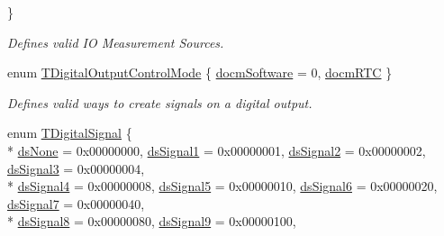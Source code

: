 \begin{DoxyCompactItemize}
 \}
\begin{DoxyCompactList}\small\item\em Defines valid I\+O Measurement Sources. \end{DoxyCompactList}\item 
enum \hyperlink{group___device_specific_interface_ga8f01f0c294f3f5476c9b9ffcec55a80b}{T\+Digital\+Output\+Control\+Mode} \{ \hyperlink{group___device_specific_interface_gga8f01f0c294f3f5476c9b9ffcec55a80bad6f74b62d8b4c41f1f25f61efa9d6aa6}{docm\+Software} = 0, 
\hyperlink{group___device_specific_interface_gga8f01f0c294f3f5476c9b9ffcec55a80baf77a5876e0696ba056ae358071a21f32}{docm\+R\+T\+C}
 \}
\begin{DoxyCompactList}\small\item\em Defines valid ways to create signals on a digital output. \end{DoxyCompactList}\item 
enum \hyperlink{group___device_specific_interface_ga29840a466892bced617a5f3a6edb5218}{T\+Digital\+Signal} \{ \\*
\hyperlink{group___device_specific_interface_gga29840a466892bced617a5f3a6edb5218a8638257c7c390c00230b6476cb9e1190}{ds\+None} = 0x00000000, 
\hyperlink{group___device_specific_interface_gga29840a466892bced617a5f3a6edb5218a7a0ab121051662930349f134122b2ff6}{ds\+Signal1} = 0x00000001, 
\hyperlink{group___device_specific_interface_gga29840a466892bced617a5f3a6edb5218aced89a35ee2a0cd3bab2c02cf30069f2}{ds\+Signal2} = 0x00000002, 
\hyperlink{group___device_specific_interface_gga29840a466892bced617a5f3a6edb5218ad9438b1702244af545d4f4364421e861}{ds\+Signal3} = 0x00000004, 
\\*
\hyperlink{group___device_specific_interface_gga29840a466892bced617a5f3a6edb5218a1c0db2967e13f97aa04135ae6818baf4}{ds\+Signal4} = 0x00000008, 
\hyperlink{group___device_specific_interface_gga29840a466892bced617a5f3a6edb5218a27cba26a8085ebce36b583ebdc54264e}{ds\+Signal5} = 0x00000010, 
\hyperlink{group___device_specific_interface_gga29840a466892bced617a5f3a6edb5218a25e8866304dea9e105766ae4ace7c896}{ds\+Signal6} = 0x00000020, 
\hyperlink{group___device_specific_interface_gga29840a466892bced617a5f3a6edb5218aabf506a0859a94cb16168a12305f1ff1}{ds\+Signal7} = 0x00000040, 
\\*
\hyperlink{group___device_specific_interface_gga29840a466892bced617a5f3a6edb5218a7a99676c8c54024110b673ca11988559}{ds\+Signal8} = 0x00000080, 
\hyperlink{group___device_specific_interface_gga29840a466892bced617a5f3a6edb5218ada827ad0367d26edf2404b309743dc66}{ds\+Signal9} = 0x00000100, 

\end{DoxyCompactItemize}
